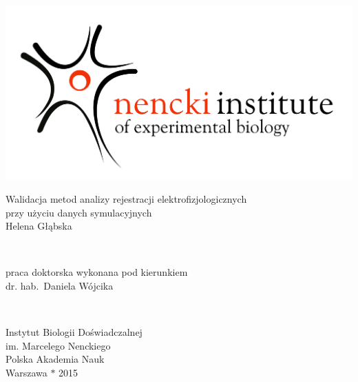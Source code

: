 \documentclass[a4paper,12pt,polish]{book}
\begin{document}
\onehalfspacing
\thispagestyle{empty}

 
\begin{center}
  
   \ \\
 

\includegraphics{../ryciny/nencki.png}
\vfill

   \begin{doublespace}
     \hspace*{-4ex}\begin{minipage}[l]{1.1\textwidth}
       \begin{center}
         {\sc\LARGE  
	Walidacja metod analizy rejestracji elektrofizjologicznych \\
 	przy użyciu danych symulacyjnych
      }\\[1em]
         {\large\sc Helena Głąbska}
       \end{center}

     \end{minipage}
   \end{doublespace}

   \vfill
\
 \vfill
  {%
  \begin{minipage}[c]{0.75\textwidth}
    \centering
    {\sc praca doktorska wykonana pod kierunkiem} \\
    {\sc dr. hab.\ Daniela Wójcika}\\
  \end{minipage}} \\
  \vfill  

  {\sc Instytut Biologii Doświadczalnej} \\
  {\sc im. Marcelego Nenckiego}\\
  {\sc Polska Akademia Nauk}\\[1em]
  {\sc Warszawa $\ast$ 2015}
\end{center}
\end{document}
